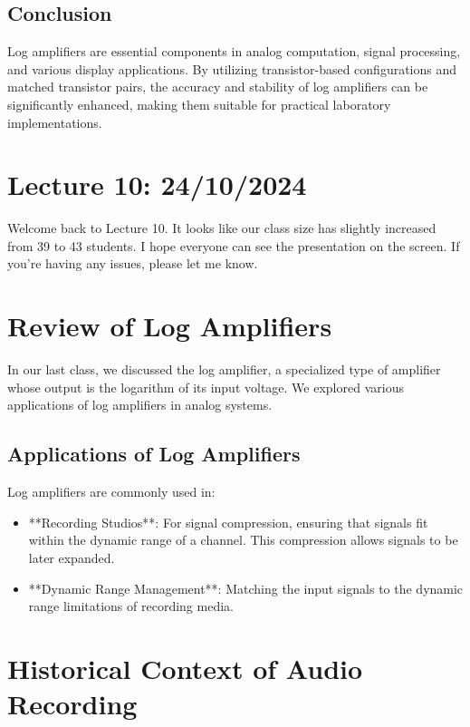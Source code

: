 \subsection{Conclusion}
Log amplifiers are essential components in analog computation, signal processing, and various display applications. By utilizing transistor-based configurations and matched transistor pairs, the accuracy and stability of log amplifiers can be significantly enhanced, making them suitable for practical laboratory implementations.

\newpage

\section{Lecture 10: 24/10/2024}

Welcome back to Lecture 10. It looks like our class size has slightly increased from 39 to 43 students. I hope everyone can see the presentation on the screen. If you're having any issues, please let me know.

\section{Review of Log Amplifiers}

In our last class, we discussed the log amplifier, a specialized type of amplifier whose output is the logarithm of its input voltage. We explored various applications of log amplifiers in analog systems.

\subsection{Applications of Log Amplifiers}

Log amplifiers are commonly used in:
\begin{itemize}
    \item **Recording Studios**: For signal compression, ensuring that signals fit within the dynamic range of a channel. This compression allows signals to be later expanded.
    \item **Dynamic Range Management**: Matching the input signals to the dynamic range limitations of recording media.
\end{itemize}

\section{Historical Context of Audio Recording}

